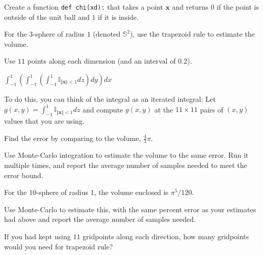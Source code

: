 \documentclass[12pt,letterpaper,noanswers]{exam}
\newcommand{\vc}[1]{\boldsymbol{#1}}
\begin{document}
\begin{questions}
\begin{parts}
\item Create a function \texttt{def chi(xd):} that takes a point $\vc{x}$ and returns $0$ if the point is outside of the unit ball and $1$ if it is inside.


\item For the $3$-sphere of radius $1$ (denoted $\mathbb{S}^2$), use the trapezoid rule to estimate the volume.

Use $11$ points along each dimension (and an interval of $0.2$).

$\displaystyle\int_{-1}^1\left(\int_{-1}^1\left(\int_{-1}^1 \mathbb{I}_{\Vert \vc{x}\Vert <1} dz \right)dy\right)dx$

To do this, you can think of the integral as an iterated integral: Let $g(x,y) = \displaystyle\int_{-1}^1 \mathbb{I}_{\Vert \vc{x}\Vert <1} dz$ and compute $g(x,y)$ at the $11\times 11$ pairs of $(x,y)$ values that you are using.

Find the error by comparing to the volume, $\frac{4}{3}\pi$.

\item Use Monte-Carlo integration to estimate the volume to the same error.  Run it multiple times, and report the average number of samples needed to meet the error bound.

\item For the $10$-sphere of radius $1$, the volume enclosed is $\pi^5/120$.

Use Monte-Carlo to estimate this, with the same percent error as your estimates had above and report the average number of samples needed.

If you had kept using $11$ gridpoints along each direction, how many gridpoints would you need for trapezoid rule?


\end{parts}

\end{questions}
\end{document}
